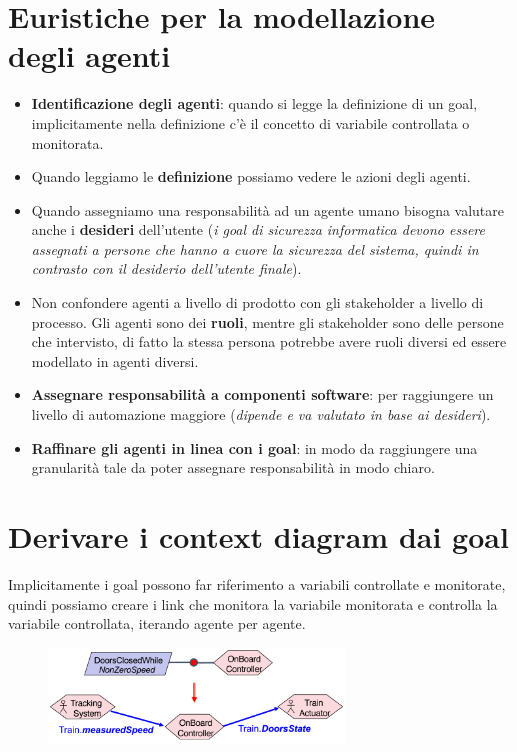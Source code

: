 \section{Euristiche per la modellazione degli agenti}
\begin{itemize}
    \item \textbf{Identificazione degli agenti}: quando si legge la definizione di un goal,
    implicitamente nella definizione c'è il concetto di variabile controllata o monitorata.
    \item Quando leggiamo le \textbf{definizione} possiamo vedere le azioni degli 
    agenti.
    \item  Quando assegniamo una responsabilità ad un agente umano bisogna valutare 
    anche i \textbf{desideri} dell'utente (\textit{i goal di sicurezza informatica devono essere 
    assegnati a persone che hanno a cuore la sicurezza del sistema, quindi in contrasto con 
    il desiderio dell'utente finale}).
    \item Non confondere agenti a livello di prodotto con gli stakeholder a livello 
    di processo. Gli agenti sono dei \textbf{ruoli}, mentre gli stakeholder sono delle
    persone che intervisto, di fatto la stessa persona potrebbe avere ruoli diversi ed 
    essere modellato in agenti diversi.
    \item \textbf{Assegnare responsabilità a componenti software}: per raggiungere 
    un livello di automazione maggiore (\textit{dipende e va valutato in base ai desideri}).
    \item \textbf{Raffinare gli agenti in linea con i goal}: in modo da raggiungere una 
    granularità tale da poter assegnare responsabilità in modo chiaro.
\end{itemize}

\section{Derivare i context diagram dai goal}
Implicitamente i goal possono far riferimento a variabili controllate e monitorate, 
quindi possiamo creare i link che monitora la variabile monitorata e controlla 
la variabile controllata, iterando agente per agente.
\begin{figure}[H]
    \centering
    \includegraphics[width=0.7\textwidth]{img/fromgoaltocontext.png}
    \label{fig:contextgoal}
\end{figure}